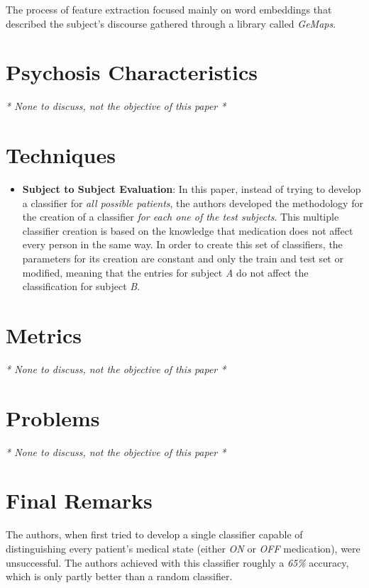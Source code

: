 \documentclass{Paper_Summary}
\begin{document}
    The process of feature extraction focused mainly on word embeddings that described the subject's discourse gathered through a library called \emph{GeMaps}.

\breakline

\newpage

\section{Psychosis Characteristics}
\emph{* None to discuss, not the objective of this paper *}

\section{Techniques}
    \begin{itemize}
        \item \textbf{Subject to Subject Evaluation}: In this paper, instead of trying to develop a classifier for \emph{all possible patients}, the authors developed the methodology for the creation of a classifier \emph{for each one of the test subjects}. This multiple classifier creation is based on the knowledge that medication does not affect every person in the same way. In order to create this set of classifiers, the parameters for its creation are constant and only the train and test set or modified, meaning that the entries for subject \emph{A} do not affect the classification for subject \emph{B}.
    \end{itemize}

\section{Metrics}
\emph{* None to discuss, not the objective of this paper *}

\section{Problems}
\emph{* None to discuss, not the objective of this paper *}


\section{Final Remarks}
    
    The authors, when first tried to develop a single classifier capable of distinguishing every patient's medical state (either \emph{ON} or \emph{OFF} medication), were unsuccessful. The authors achieved with this classifier roughly a \emph{65\%} accuracy, which is only partly better than a random classifier.
\end{document}
